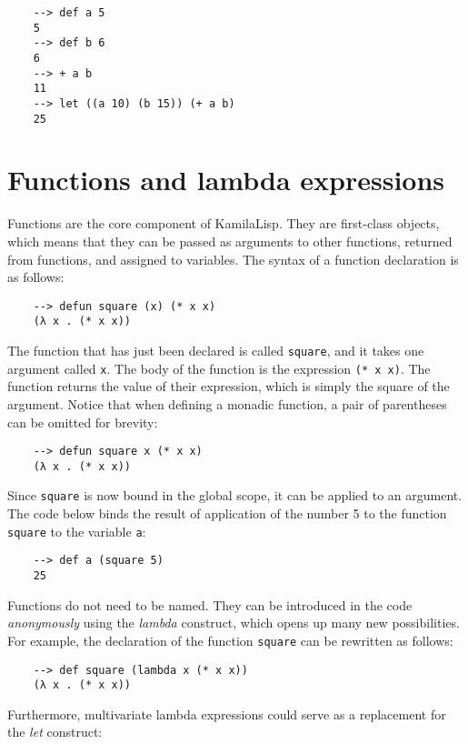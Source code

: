 \begin{Verbatim}
    --> def a 5
    5
    --> def b 6
    6
    --> + a b
    11
    --> let ((a 10) (b 15)) (+ a b)
    25
\end{Verbatim}

\section{Functions and lambda expressions}

Functions are the core component of KamilaLisp. They are first-class objects, which means that they can be passed as arguments to other functions, returned from functions, and assigned to variables. The syntax of a function declaration is as follows:

\begin{Verbatim}
    --> defun square (x) (* x x)
    (λ x . (* x x))
\end{Verbatim}

The function that has just been declared is called \verb|square|, and it takes one argument called \verb|x|. The body of the function is the expression \verb|(* x x)|. The function returns the value of their expression, which is simply the square of the argument. Notice that when defining a monadic function, a pair of parentheses can be omitted for brevity:

\begin{Verbatim}
    --> defun square x (* x x)
    (λ x . (* x x))
\end{Verbatim}

Since \verb|square| is now bound in the global scope, it can be applied to an argument. The code below binds the result of application of the number 5 to the function \verb|square| to the variable \verb|a|:

\begin{Verbatim}
    --> def a (square 5)
    25
\end{Verbatim}

Functions do not need to be named. They can be introduced in the code \textit{anonymously} using the \textit{lambda} construct, which opens up many new possibilities. For example, the declaration of the function \verb|square| can be rewritten as follows:

\begin{Verbatim}
    --> def square (lambda x (* x x))
    (λ x . (* x x))
\end{Verbatim}

Furthermore, multivariate lambda expressions could serve as a replacement for the \textit{let} construct:

